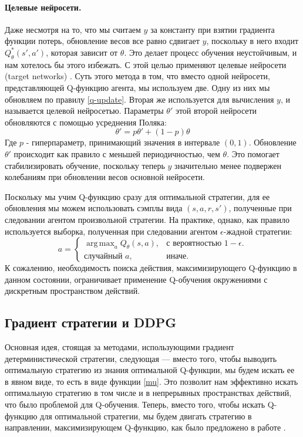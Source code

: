 \documentclass[12pt, a4paper]{extarticle}
\DeclareMathOperator*{\argmax}{arg\,max}
\theoremstyle{definition}
\begin{document}
\paragraph{Целевые нейросети.}\label{target}
Даже несмотря на то, что мы считаем $y$ за константу при взятии градиента функции потерь, обновление весов все равно сдвигает $y$, поскольку в него входит $Q_{\theta}^{*}(s',a')$, которая зависит от $\theta$. Это делает процесс обучения неустойчивым, и нам хотелось бы этого избежать. С этой целью применяют целевые нейросети (target networks) \cite{mnih2013playing}. Суть этого метода в том, что вместо одной нейросети, представляющей Q-функцию агента, мы используем две. Одну из них мы обновляем по правилу \ref{q-update}. Вторая же используется для вычисления $y$, и называется целевой нейросетью. Параметры $\theta'$ этой второй нейросети обновляются с помощью усреднения Поляка:
\begin{equation}
    \theta' = p\theta' + (1-p)\theta
\end{equation}
Где $p$ - гиперпараметр, принимающий значения в интервале $(0,1)$. Обновление $\theta'$ происходит как правило с меньшей периодичностью, чем $\theta$. Это помогает стабилизировать обучение, поскольку теперь $y$ значительно менее подвержен колебаниям при обновлении весов основной нейросети. 

Поскольку мы учим Q-функцию сразу для оптимальной стратегии, для ее обновления мы можем использовать сэмплы вида $(s,a,r,s')$, полученные при следовании агентом произвольной стратегии. На практике, однако, как правило используется выборка, полученная при следовании агентом $\epsilon$-жадной стратегии:
\begin{equation}
      a=\begin{cases}
    \displaystyle \argmax_{a} Q_{\theta}(s,a), & \text{с вероятностью $1-\epsilon$}.\\
    \text{случайный $a$}, & \text{иначе}.
  \end{cases}
\end{equation}
К сожалению, необходимость поиска действия, максимизирующего Q-функцию в данном состоянии, ограничивает применение Q-обучения окружениями с дискретным пространством действий. 

\subsection{Градиент стратегии и DDPG}

Основная идея, стоящая за методами, использующими градиент детерминистической стратегии, следующая --- вместо того, чтобы выводить оптимальную стратегию из знания оптимальной Q-функции, мы будем искать ее в явном виде, то есть в виде функции \ref{mu}. Это позволит нам эффективно искать оптимальную стратегию в том числе и в непрерывных пространствах действий, что было проблемой для Q-обучения. Теперь, вместо того, чтобы искать Q-функцию для оптимальной стратегии, мы будем двигать стратегию в направлении, максимизирующем Q-функцию, как было предложено в работе \cite{silver2014deterministic}. 
\end{document}

